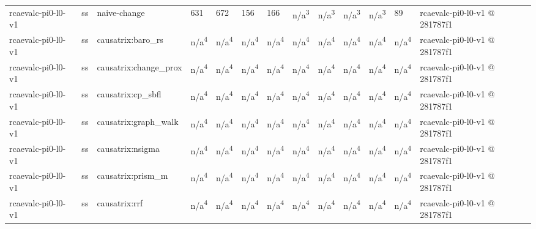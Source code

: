 \begin{table}[t]
\begin{tabular}{lllllllllllll}
rcaevalc-pi0-l0-v1 & ss & naive-change & 631 & 672 & 156 & 166 & n/a\textsuperscript{3} & n/a\textsuperscript{3} & n/a\textsuperscript{3} & n/a\textsuperscript{3} & 89 & rcaevalc-pi0-l0-v1 @ 281787f1 \\
rcaevalc-pi0-l0-v1 & ss & causatrix:baro\_rs & n/a\textsuperscript{4} & n/a\textsuperscript{4} & n/a\textsuperscript{4} & n/a\textsuperscript{4} & n/a\textsuperscript{4} & n/a\textsuperscript{4} & n/a\textsuperscript{4} & n/a\textsuperscript{4} & n/a\textsuperscript{4} & rcaevalc-pi0-l0-v1 @ 281787f1 \\
rcaevalc-pi0-l0-v1 & ss & causatrix:change\_prox & n/a\textsuperscript{4} & n/a\textsuperscript{4} & n/a\textsuperscript{4} & n/a\textsuperscript{4} & n/a\textsuperscript{4} & n/a\textsuperscript{4} & n/a\textsuperscript{4} & n/a\textsuperscript{4} & n/a\textsuperscript{4} & rcaevalc-pi0-l0-v1 @ 281787f1 \\
rcaevalc-pi0-l0-v1 & ss & causatrix:cp\_sbfl & n/a\textsuperscript{4} & n/a\textsuperscript{4} & n/a\textsuperscript{4} & n/a\textsuperscript{4} & n/a\textsuperscript{4} & n/a\textsuperscript{4} & n/a\textsuperscript{4} & n/a\textsuperscript{4} & n/a\textsuperscript{4} & rcaevalc-pi0-l0-v1 @ 281787f1 \\
rcaevalc-pi0-l0-v1 & ss & causatrix:graph\_walk & n/a\textsuperscript{4} & n/a\textsuperscript{4} & n/a\textsuperscript{4} & n/a\textsuperscript{4} & n/a\textsuperscript{4} & n/a\textsuperscript{4} & n/a\textsuperscript{4} & n/a\textsuperscript{4} & n/a\textsuperscript{4} & rcaevalc-pi0-l0-v1 @ 281787f1 \\
rcaevalc-pi0-l0-v1 & ss & causatrix:nsigma & n/a\textsuperscript{4} & n/a\textsuperscript{4} & n/a\textsuperscript{4} & n/a\textsuperscript{4} & n/a\textsuperscript{4} & n/a\textsuperscript{4} & n/a\textsuperscript{4} & n/a\textsuperscript{4} & n/a\textsuperscript{4} & rcaevalc-pi0-l0-v1 @ 281787f1 \\
rcaevalc-pi0-l0-v1 & ss & causatrix:prism\_m & n/a\textsuperscript{4} & n/a\textsuperscript{4} & n/a\textsuperscript{4} & n/a\textsuperscript{4} & n/a\textsuperscript{4} & n/a\textsuperscript{4} & n/a\textsuperscript{4} & n/a\textsuperscript{4} & n/a\textsuperscript{4} & rcaevalc-pi0-l0-v1 @ 281787f1 \\
rcaevalc-pi0-l0-v1 & ss & causatrix:rrf & n/a\textsuperscript{4} & n/a\textsuperscript{4} & n/a\textsuperscript{4} & n/a\textsuperscript{4} & n/a\textsuperscript{4} & n/a\textsuperscript{4} & n/a\textsuperscript{4} & n/a\textsuperscript{4} & n/a\textsuperscript{4} & rcaevalc-pi0-l0-v1 @ 281787f1 \\

\end{tabular}
\end{table}

